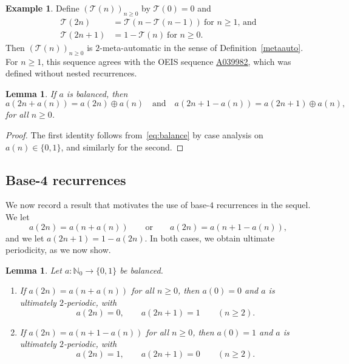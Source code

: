 \documentclass[12pt,reqno]{article}
\newcommand{\seqnum}[1]{\href{https://oeis.org/#1}{\rm \underline{#1}}}
\theoremstyle{plain}
\newtheorem{lemma}[theorem]{Lemma}
\theoremstyle{definition}
\newtheorem{example}[theorem]{Example}
\theoremstyle{remark}
\begin{document}
\begin{example}
 Define $(\mathcal{T}(n))_{n\ge 0}$ by $\mathcal{T}(0)=0$ and
\begin{align*}
 \mathcal{T}(2n) & = \mathcal{T}(n - \mathcal{T}(n-1)) \ \text{for $n \geq 1$, and} \\
 \mathcal{T}(2n+1) & = 1 - \mathcal{T}(n) \ \text{for $n \geq 0$}.
\end{align*}
 Then $(\mathcal{T}(n))_{n\ge 0}$ is $2$-meta-automatic in the sense of
 Definition~\ref{metaauto}. For $n\ge 1$, this sequence agrees with the OEIS sequence
 \seqnum{A039982}, which was defined without nested recurrences.
\end{example}

\begin{lemma}\label{lem:balance-xor} 
 If $a$ is balanced, then $$ a(2n+a(n)) = a(2n)\oplus a(n) \quad\text{and}\quad a(2n+1-a(n)) = a(2n+1)\oplus a(n), $$ for all $n\ge 0$. 
\end{lemma}

\begin{proof}
 The first identity follows from~\eqref{eq:balance} by case analysis on $a(n)\in\{0,1\}$, and similarly for the second.
\end{proof}

\subsection{Base-4 recurrences}
 We now record a result that motivates the use of base-$4$ recurrences in the sequel. We let $$ a(2n)=a(n+a(n))\qquad 
 \text{or}\qquad a(2n)=a(n+1-a(n)), $$ and we let $a(2n+1)=1-a(2n)$. In both cases, we obtain ultimate periodicity, as we now show.

\begin{lemma}\label{lem:dyadic} 
 Let $a:\mathbb{N}_0\to\{0,1\}$ be balanced.
\begin{enumerate}
\renewcommand{\labelenumi}{(\alph{enumi})}
\item If $a(2n)=a(n+a(n))$ for all $n\ge 0$, then $a(0)=0$ and 
 $a$ is ultimately $2$-periodic, with 
 $$ a(2n)=0,\qquad a(2n+1)=1\qquad (n\ge 2). $$

\item If $a(2n)=a(n+1-a(n))$ for all $n\ge 0$, then $a(0)=1$ and $a$ is ultimately $2$-periodic, with 
$$ a(2n)=1,\qquad a(2n+1)=0\qquad (n\ge 2). $$
\end{enumerate}
\end{lemma}
 
\end{document}
